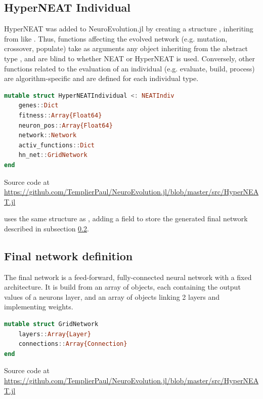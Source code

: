\subsection{HyperNEAT Individual}

HyperNEAT was added to NeuroEvolution.jl by creating a structure , inheriting from  like . Thus, functions affecting the evolved network (e.g. mutation, crossover, populate) take as arguments any object inheriting from the abstract type , and are blind to whether NEAT or HyperNEAT is used. Conversely, other functions related to the evaluation of an individual (e.g. evaluate, build, process) are algorithm-specific and are defined for each individual type.

\begin{minipage}{\linewidth}
\begin{lstlisting}[language=Julia, caption=HyperNEAT Individual]
mutable struct HyperNEATIndividual <: NEATIndiv
    genes::Dict
    fitness::Array{Float64}
    neuron_pos::Array{Float64}
    network::Network
    activ_functions::Dict
    hn_net::GridNetwork
end
\end{lstlisting}
Source code at \url{https://github.com/TemplierPaul/NeuroEvolution.jl/blob/master/src/HyperNEAT.jl}\\
\end{minipage}

 uses the same structure as , adding a  field to store the generated final network described in subsection \ref{sub:final-hn-net}.

\subsection{Final network definition}
\label{sub:final-hn-net}
The final network is a feed-forward, fully-connected neural network with a fixed architecture. It is build from an array of  objects, each containing the output values of a neurons layer, and an array of  objects linking 2 layers and implementing weights. 

\begin{minipage}{\linewidth}
\begin{lstlisting}[language=Julia, caption=HyperNEAT final network]
mutable struct GridNetwork
    layers::Array{Layer}
    connections::Array{Connection}
end
\end{lstlisting}
Source code at \url{https://github.com/TemplierPaul/NeuroEvolution.jl/blob/master/src/HyperNEAT.jl}\\
\end{minipage}

